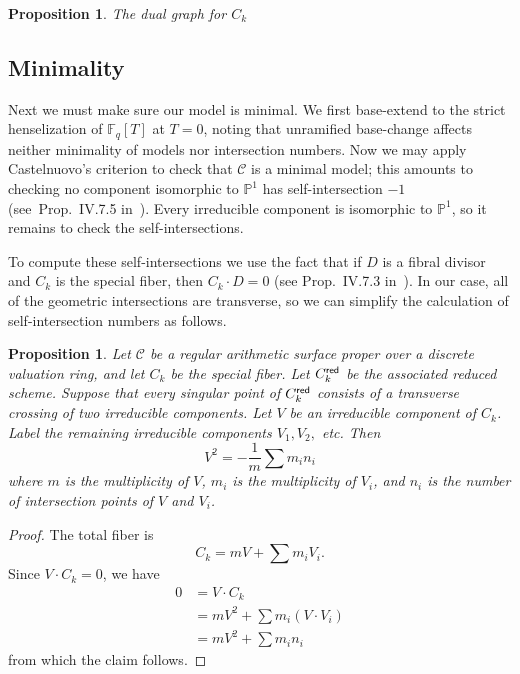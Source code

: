 \documentclass[reqno]{amsart}
\newtheorem{proposition}[thm]{Proposition}
\theoremstyle{definition}
\theoremstyle{remark}
\def\F{\mathbb{F}}
\def\scd{\mathscr{C}}
\def\Pro{\ensuremath{\mathbb{P}}}
\begin{document}
  
\begin{proposition}\label{prop:dual-graph-plus-multiplicities}
  The dual graph for $C_k$ 
\end{proposition}


\subsection{Minimality}
\label{sec:minimality}

Next we must make sure our model is minimal. We first base-extend to the strict henselization of $\F_q[T]$ at $T = 0$, noting that unramified base-change affects neither minimality of models nor intersection numbers. Now we may apply Castelnuovo's criterion to check that $\scd$ is a minimal model; this amounts to checking no component isomorphic to $\Pro^1$ has self-intersection $-1$ (see~Prop.~IV.7.5 in~\cite{silvermanATAEC}). Every irreducible component is isomorphic to $\Pro^1$, so it remains to check the self-intersections. 

To compute these self-intersections we use the fact that if $D$ is a fibral divisor and $C_k$ is the special fiber, then $C_k \cdot D = 0$ (see Prop.~IV.7.3 in~\cite{silvermanATAEC}). In our case, all of the geometric intersections are transverse, so we can simplify the calculation of self-intersection numbers as follows.
\begin{proposition}\label{prop:transverse-self-intersections}
  Let $\scd$ be a regular arithmetic surface proper over a discrete valuation ring, and let $C_k$ be the special fiber. Let $C_k^{\sf red}$ be the associated reduced scheme. Suppose that every singular point of $C_k^{\sf red}$ consists of a transverse crossing of two irreducible components. Let $V$ be an irreducible component of $C_k$. Label the remaining irreducible components $V_1, V_2,$ etc. Then
  \[
  V^2 = -\frac{1}{m} \sum m_i n_i
  \]
  where $m$ is the multiplicity of $V$, $m_i$ is the multiplicity of $V_i$, and $n_i$ is the number of intersection points of $V$ and $V_i$.
\end{proposition}

\begin{proof}
  The total fiber is
  \[
  C_k = mV + \sum m_i V_i.
  \]
  Since $V \cdot C_k = 0$, we have
  \begin{align*}
    0 &= V \cdot C_k \\
    &= mV^2 + \sum m_i (V \cdot V_i) \\
    &= mV^2 + \sum m_i n_i
  \end{align*}
  from which the claim follows.
\end{proof}
\end{document}
